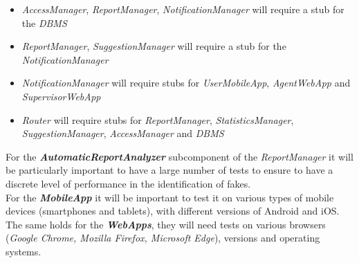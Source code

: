 \documentclass[a4paper]{report}
\begin{document}
\begin{itemize}
\item \textit{AccessManager}, \textit{ReportManager}, \textit{NotificationManager} will require a stub for the \textit{DBMS}
\item \textit{ReportManager}, \textit{SuggestionManager} will require a stub for the \textit{NotificationManager}
\item \textit{NotificationManager} will require stubs for \textit{UserMobileApp}, \textit{AgentWebApp} and \textit{SupervisorWebApp}
\item \textit{Router} will require stubs for \textit{ReportManager}, \textit{StatisticsManager}, \textit{SuggestionManager}, \textit{AccessManager} and \textit{DBMS}
\end{itemize}
For the \textbf{\textit{AutomaticReportAnalyzer}} subcomponent of the \textit{ReportManager} it will be particularly important to have a large number of tests to ensure to have a discrete level of performance in the identification of fakes.\\
For the \textbf{\textit{MobileApp}} it will be important to test it on various types of mobile devices (smartphones and tablets), with different versions of Android and iOS. The same holds for the \textbf{\textit{WebApps}}, they will need tests on various browsers (\textit{Google Chrome, Mozilla Firefox, Microsoft Edge}), versions and operating systems.
\end{document}
